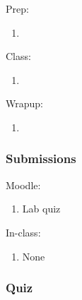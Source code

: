 \documentclass[12pt]{article}
\begin{document}
Prep:
\begin{enumerate}
\item
\end{enumerate}

\noindent
Class:
\begin{enumerate}
\item
\end{enumerate}

\noindent
Wrapup:
\begin{enumerate}
\item
\end{enumerate}


\subsubsection{Submissions}

Moodle:
\begin{enumerate}
\item Lab quiz
\end{enumerate}

\noindent
In-class:
\begin{enumerate}
\item None
\end{enumerate}


\subsubsection{Quiz}
\end{document}
